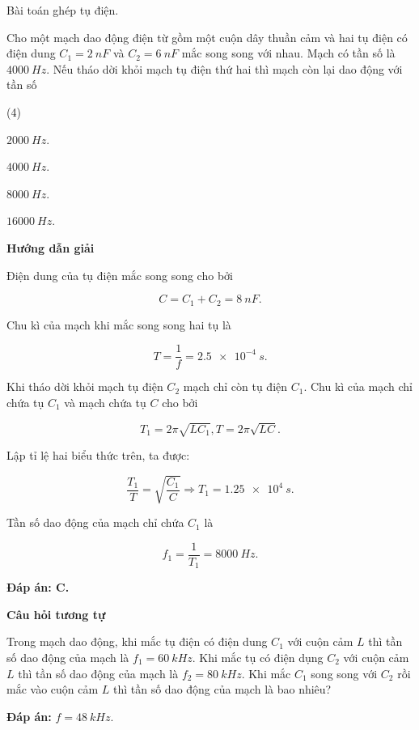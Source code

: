 \begin{dang}{Bài toán ghép tụ điện.}
		{Cho một mạch dao động điện từ gồm một cuộn dây thuần cảm và hai tụ điện có điện dung $C_1 = \SI{2}{nF}$ và $C_2 = \SI{6}{nF}$ mắc song song với nhau. Mạch có tần số là $\SI{4000}{Hz}$. Nếu  tháo dời khỏi mạch tụ điện thứ hai thì mạch còn lại dao động với tần số
		\begin{mcq}(4)
			\item $\SI{2000}{Hz}$. 
			\item $\SI{4000}{Hz}$. 
			\item $\SI{8000}{Hz}$. 
			\item $\SI{16000}{Hz}$. 
		\end{mcq}
	}
	{	\begin{center}
			\textbf{Hướng dẫn giải}
		\end{center}
		
		Điện dung của tụ điện mắc song song cho bởi
		
		$$C=C_{1}+C_{2}= \SI{8}{nF}.$$
		
		Chu kì của mạch khi mắc song song hai tụ là
		
		$$T=\dfrac{1}{f}= \SI{2,5 e-4}{s}.$$
		
		Khi tháo dời khỏi mạch tụ điện $C_{2}$ mạch chỉ còn tụ điện $C_{1}$. Chu kì của mạch chỉ chứa tụ $C_{1}$ và mạch chứa tụ $C$ cho bởi
		
		$$T_{1} =2 \pi \sqrt{L C_{1}}, T =2 \pi \sqrt{L C}.$$
		
		Lập tỉ lệ hai biểu thức trên, ta được:
		
		$$\dfrac{T_{1}}{T}=\sqrt{\dfrac{C_{1}}{C}}\Rightarrow T_{1}= \SI{1,25 e4}{s}.$$
		
		Tần số dao động của mạch chỉ chứa $C_{1}$ là
		
		$$f_{1}=\dfrac{1}{T_{1}}= \SI{8000}{Hz}.$$	
		
		\textbf{Đáp án: C.}
		
		\begin{center}
			\textbf{Câu hỏi tương tự}
		\end{center}
		
	Trong mạch dao động, khi mắc tụ điện có điện dung $C_1$ với cuộn cảm $L$ thì tần số dao động của mạch là $f_1 = \SI{60}{kHz}$. Khi mắc tụ có điện dụng $C_2$ với cuộn cảm $L$ thì tần số dao động của mạch là $f_2 = \SI{80}{kHz}$. Khi mắc $C_1$ song song với $C_2$ rồi mắc vào cuộn cảm $L$ thì tần số dao động của mạch là bao nhiêu?

	\textbf{Đáp án:} $f= \SI{48}{kHz}.$ 
	}
\end{dang}
